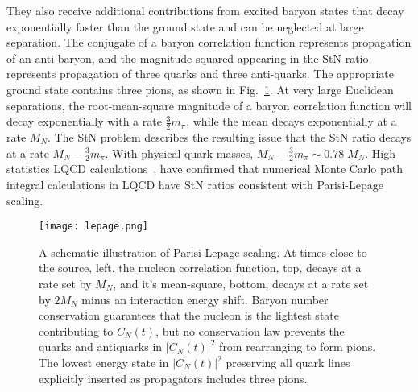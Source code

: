 They also receive additional contributions from excited baryon states that decay exponentially faster than the ground state and can be neglected at large separation.
The conjugate of a baryon correlation function represents propagation of an anti-baryon, and the magnitude-squared appearing in the StN ratio represents propagation of three quarks and three anti-quarks.
The appropriate ground state contains three pions, as shown in Fig.~\ref{fig:lepage}.
At very large Euclidean separations, the root-mean-square magnitude of a baryon correlation function will decay exponentially with a rate $\frac{3}{2}m_\pi$, while the mean decays exponentially at a rate $M_N$.
The StN problem describes the resulting issue that the StN ratio decays at a rate $M_N - \frac{3}{2}m_\pi$.
With physical quark masses, $M_N - \frac{3}{2}m_\pi \sim 0.78\; M_N$.
High-statistics LQCD calculations~\cite{Beane:2009kya,Beane:2010em,Beane:2014oea,Detmold:2014rfa,Detmold:2014hla,Wagman:2016bam,Wagman:2017xfh}, have confirmed that numerical Monte Carlo path integral calculations in LQCD have StN ratios consistent with Parisi-Lepage scaling. 

\begin{figure}[!ht]
  \begin{center}
  \texttt{[image: lepage.png]}
\end{center}
  \caption{A schematic illustration of Parisi-Lepage scaling.
    At times close to the source, left, the nucleon correlation function, top, decays at a rate set by $M_N$, and it's mean-square, bottom, decays at a rate set by $2M_N$ minus an interaction energy shift.
    Baryon number conservation guarantees that the nucleon is the lightest state contributing to $C_N(t)$, but no conservation law prevents the quarks and antiquarks in $|C_N(t)|^2$ from rearranging to form pions.
    The lowest energy state in $|C_N(t)|^2$ preserving all quark lines explicitly inserted as propagators includes three pions.
  }
  \label{fig:lepage}
\end{figure}

